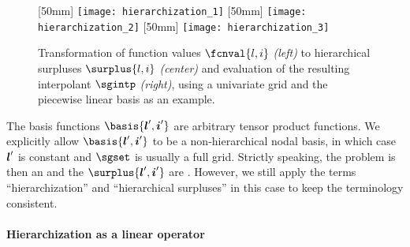 \begin{figure}
  [50mm]{%
    \texttt{[image: hierarchization\_1]}%
  }%
  \hfill%
  [50mm]{%
    \texttt{[image: hierarchization\_2]}%
  }%
  \hfill%
  [50mm]{%
    \texttt{[image: hierarchization\_3]}%
  }%
  \caption[%
    Hierarchization of function values and evaluation of interpolant%
  ]{%
    Transformation of function values $\fcnval{l,i}$ \emph{(left)}
    to hierarchical surpluses $\surplus{l,i}$ \emph{(center)} and
    evaluation of the resulting interpolant $\sgintp$ \emph{(right)},
    using a univariate grid and the piecewise linear basis as an example.%
  }%
  \label{fig:hierarchization}%
\end{figure}

The basis functions $\basis{\*l',\*i'}$ are
arbitrary tensor product functions.
We explicitly allow $\basis{\*l',\*i'}$ to be a non-hierarchical
nodal basis, in which case ${\boldsymbol{l}}'$ is constant and
$\sgset$ is usually a full grid.
Strictly speaking, the problem is then an 
and the $\surplus{\*l',\*i'}$ are .
However, we still apply the terms
``hierarchization'' and ``hierarchical surpluses'' in this case
to keep the terminology consistent.

\paragraph{Hierarchization as a linear operator}

